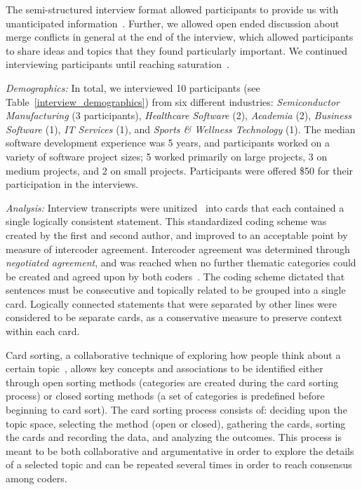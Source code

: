 The semi-structured interview format allowed participants to provide us with unanticipated information~\cite{seaman2008qualitative}. Further, we allowed open ended discussion about merge conflicts in general at the end of the interview, which allowed participants to share ideas and topics that they found particularly important. We continued interviewing participants until reaching saturation~\cite{fusch2015we}.

\textit{Demographics:} In total, we interviewed 10 participants (see Table~\ref{interview_demographics}) from six different industries: \textit{Semiconductor Manufacturing} (3 participants), \textit{Healthcare Software} (2), \textit{Academia} (2), \textit{Business Software} (1), \textit{IT Services} (1), and \textit{Sports \& Wellness Technology} (1). The median software development experience was 5 years, and participants worked on a variety of software project sizes; 5 worked primarily on large projects, 3 on medium projects, and 2 on small projects. Participants were offered \$50 for their participation in the interviews.

\textit{Analysis:} Interview transcripts were unitized~\cite{unitization} into cards that each contained a single logically consistent statement. This standardized coding scheme was created by the first and second author, and improved to an acceptable point by measure of intercoder agreement.
Intercoder agreement was determined through \textit{negotiated agreement}, and was reached when no further thematic categories could be created and agreed upon by both coders~\cite{garrison2006revisiting}\cite{ritchie2013qualitative}.
The coding scheme dictated that sentences must be consecutive and topically related to be grouped into a single card. Logically connected statements that were separated by other lines were considered to be separate cards, as a conservative measure to preserve context within each card.

Card sorting, a collaborative technique of exploring how people think about a certain topic~\cite{spencer2009card}\cite{card_sort},  allows key concepts and associations to be identified either through open sorting methods (categories are created during the card sorting process) or closed sorting methods (a set of categories is predefined before beginning to card sort).
The card sorting process consists of: deciding upon the topic space, selecting the method (open or closed), gathering the cards, sorting the cards and recording the data, and analyzing the outcomes.
This process is meant to be both collaborative and argumentative in order to explore the details of a selected topic and can be repeated several times in order to reach consensus among coders.

